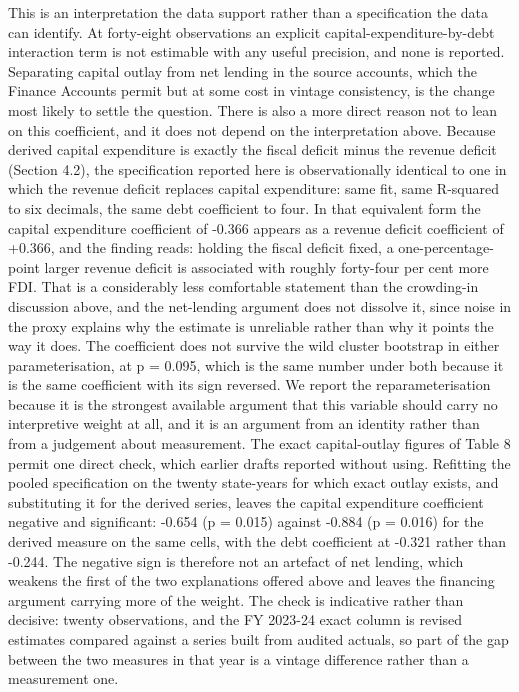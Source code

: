 \documentclass[12pt,a4paper]{article}
\begin{document}
This is an interpretation the data support rather than a specification the data can identify. At forty-eight observations an explicit capital-expenditure-by-debt interaction term is not estimable with any useful precision, and none is reported. Separating capital outlay from net lending in the source accounts, which the Finance Accounts permit but at some cost in vintage consistency, is the change most likely to settle the question. There is also a more direct reason not to lean on this coefficient, and it does not depend on the interpretation above. Because derived capital expenditure is exactly the fiscal deficit minus the revenue deficit (Section 4.2), the specification reported here is observationally identical to one in which the revenue deficit replaces capital expenditure: same fit, same R-squared to six decimals, the same debt coefficient to four. In that equivalent form the capital expenditure coefficient of -0.366 appears as a revenue deficit coefficient of +0.366, and the finding reads: holding the fiscal deficit fixed, a one-percentage-point larger revenue deficit is associated with roughly forty-four per cent more FDI. That is a considerably less comfortable statement than the crowding-in discussion above, and the net-lending argument does not dissolve it, since noise in the proxy explains why the estimate is unreliable rather than why it points the way it does. The coefficient does not survive the wild cluster bootstrap in either parameterisation, at p = 0.095, which is the same number under both because it is the same coefficient with its sign reversed. We report the reparameterisation because it is the strongest available argument that this variable should carry no interpretive weight at all, and it is an argument from an identity rather than from a judgement about measurement. The exact capital-outlay figures of Table 8 permit one direct check, which earlier drafts reported without using. Refitting the pooled specification on the twenty state-years for which exact outlay exists, and substituting it for the derived series, leaves the capital expenditure coefficient negative and significant: -0.654 (p = 0.015) against -0.884 (p = 0.016) for the derived measure on the same cells, with the debt coefficient at -0.321 rather than -0.244. The negative sign is therefore not an artefact of net lending, which weakens the first of the two explanations offered above and leaves the financing argument carrying more of the weight. The check is indicative rather than decisive: twenty observations, and the FY 2023-24 exact column is revised estimates compared against a series built from audited actuals, so part of the gap between the two measures in that year is a vintage difference rather than a measurement one.
\end{document}
